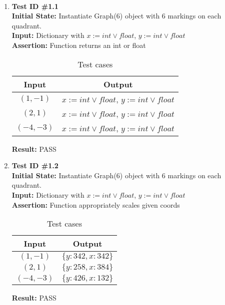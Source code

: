 \documentclass[12pt, titlepage]{article}
\begin{document}
	\paragraph{}
		\begin{enumerate}
			\item{\textbf{Test ID \#1.1\\}}
			\textbf{Initial State:} Instantiate Graph(6) object with 6 markings on each quadrant.\\
			\textbf{Input:} Dictionary with $x:= int \vee float$, $y:= int \vee float$ \\
			\textbf{Assertion:} Function returns an int or float \\
			\begin{table}[h!]
			  \centering
			  \caption{Test cases}
			  \begin{tabular}{|c|c|}
			  	\toprule
			   	 Input & Output\\
			   	 \midrule
			   	 $(1,-1) $  & $x:= int \vee float$, $y:= int \vee float$\\
			   	 $(2,1)$ &  $x:= int \vee float$, $y:= int \vee float$\\
			   	 $(-4,-3)$ & $x:= int \vee float$, $y:= int \vee float$\\

			   	 \bottomrule
			  \end{tabular}
			\end{table}

			\textbf{Result:} PASS
			
			\item{\textbf{Test ID \#1.2\\}}
			\textbf{Initial State:} Instantiate Graph(6) object with 6 markings on each quadrant.\\
			\textbf{Input:} Dictionary with $x:= int \vee float$, $y:= int \vee float$ \\
			\textbf{Assertion:} Function appropriately scales given coords \\
			\begin{table}[h!]
			  \centering
			  \caption{Test cases}
			  \begin{tabular}{|c|c|}
			  	\toprule
			   	 Input & Output\\
			   	 \midrule
			   	 $(1,-1) $  & $\lbrace y: 342, x: 342 \rbrace$\\
			   	 $(2,1)$ &  $\lbrace y: 258, x: 384 \rbrace$\\
			   	 $(-4,-3)$ & $\lbrace y: 426, x: 132 \rbrace$\\
			   	 \bottomrule
			  \end{tabular}
			\end{table}
			\textbf{Result:} PASS
			
		\end{enumerate}
\end{document}
